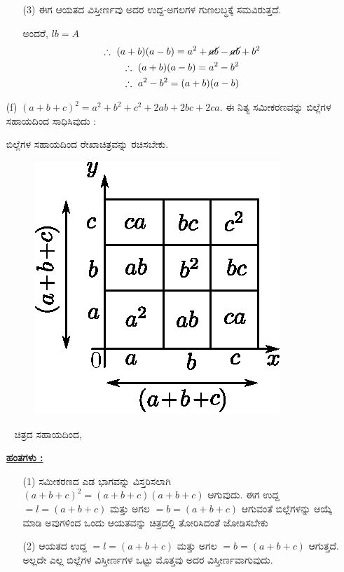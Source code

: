 \begin{enumerate}
\begin{itemize}
\item[(3)] ಈಗ ಆಯತದ ವಿಸ್ತೀರ್ಣವು ಅದರ ಉದ್ದ-ಅಗಲಗಳ ಗುಣಲಬ್ಧಕ್ಕೆ ಸಮವಿರುತ್ತದೆ.

ಅಂದರೆ, $lb = A$
\begin{gather*}
\therefore~ (a+b)(a-b) = a^2 + \cancel{ab} - \cancel{ab} + b^2\\
\therefore~ (a+b)(a-b) = a^2 - b^2\\
\therefore~ a^2 - b^2 = (a+b)(a-b)
\end{gather*}
\end{itemize}


\item[(f)] $(a+b+c)^2 = a^2 + b^2 + c^2 + 2ab + 2bc + 2ca.$ ಈ ನಿತ್ಯ ಸಮೀಕರಣವನ್ನು ಬಿಲ್ಲೆಗಳ ಸಹಾಯದಿಂದ ಸಾಧಿಸಿವುದು :

ಬಿಲ್ಲೆಗಳ ಸಹಾಯದಿಂದ ರೇಖಾಚಿತ್ರವನ್ನು ರಚಿಸಬೇಕು.
\begin{figure}[H]
\centering
\includegraphics[scale=0.8]{src/figure/chap3/fig3-32f.eps}
\end{figure}
~
\vskip -0.5cm
ಚಿತ್ರದ ಸಹಾಯದಿಂದ,


\noindent
{\textbf{\underline{ಹಂತಗಳು :}}}
\begin{itemize}
\item[(1)] ಸಮೀಕರಣದ ಎಡ ಭಾಗವನ್ನು ವಿಸ್ತರಿಸಲಾಗಿ $(a+b+c)^2 = (a+b+c)(a+b+c)$ ಆಗುವುದು. ಈಗ ಉದ್ದ $= l = (a+b+c)$ ಮತ್ತು ಅಗಲ $= b = (a+b+c)$ ಆಗುವಂತೆ ಬಿಲ್ಲೆಗಳನ್ನು ಆಯ್ಕೆ ಮಾಡಿ ಅವುಗಳಿಂದ ಒಂದು ಆಯತವನ್ನು ಚಿತ್ರದಲ್ಲಿ ತೋರಿಸಿದಂತೆ ಜೋಡಿಸಬೇಕು
\item[(2)] ಆಯತದ ಉದ್ದ $= l = (a+b+c)$ ಮತ್ತು ಅಗಲ $= b = (a+b+c)$ ಆಗುತ್ತದೆ. ಅಲ್ಲದೇ ಎಲ್ಲ ಬಿಲ್ಲೆಗಳ ವಿಸ್ತೀರ್ಣಗಳ ಒಟ್ಟು ಮೊತ್ತವು ಅದರ ವಿಸ್ತೀರ್ಣವಾಗುವುದು. 


\end{itemize}
\end{enumerate}
